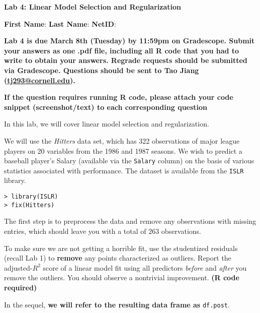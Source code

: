 \documentclass{article}
\begin{document}
        \begin{center}
        {\Large \bf Lab 4: Linear Model Selection and Regularization}

            \bigskip

                {\bf First Name}: \underline{\hspace{2.5cm}}  {\bf Last Name}:
                \underline{\hspace{2.5cm}} {\bf NetID}:
                \underline{\hspace{2.5cm}}
            \end{center}
\textbf{Lab 4 is due March 8th (Tuesday) by 11:59pm on Gradescope. Submit your
answers as one .pdf file, including all R code that you had to write to obtain
your answers. Regrade requests should be submitted via Gradescope.
Questions should be sent to Tao Jiang (\url{tj293@cornell.edu}).}

\bigskip
\textbf {If the question requires running R code, please attach your code snippet (screenshot/text) to each corresponding question}
\bigskip

In this lab, we will cover linear model selection and regularization.

\bigskip

We will use the \textit{Hitters} data set, which has 322 observations of major
league players on 20 variables from the 1986 and 1987 seasons. We wish to
predict a baseball player's Salary (available via the \texttt{Salary} column)
on the basis of various statistics associated with performance. The dataset is
available from the \texttt{ISLR} library.

\begin{Verbatim}[frame=single]
> library(ISLR)
> fix(Hitters)
\end{Verbatim}

The first step is to preprocess the data and remove any observations with
missing entries, which should leave you with a total of $263$ observations.

To make sure we are not getting a horrible fit, use the studentized residuals
(recall Lab 1) to \textbf{remove} any points characterized as outliers. Report
the adjusted-$R^2$ score of a linear model fit using all predictors
\textit{before} and \textit{after} you remove the outliers. You should observe
a nontrivial improvement. \textbf{(R code required)}

In the sequel, \textbf{we will refer to the resulting data frame as }
\texttt{df.post}. 

\begin{Verbatim}[frame=single]










\end{Verbatim}
\end{document}
